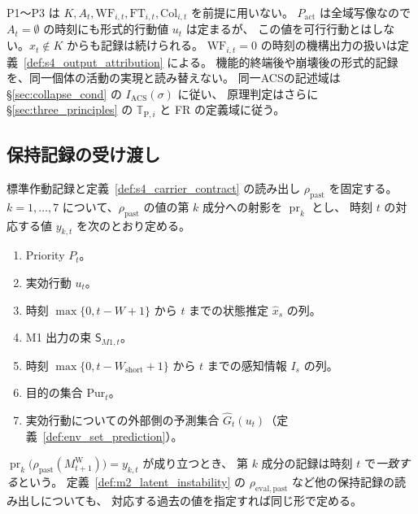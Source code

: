 \begin{remark}[形式的継続と実現の継続]
\label{rem:s5_formal_not_survival}
P1〜P3 は $K,A_t,\mathrm{WF}_{i,t},\mathrm{FT}_{i,t},\mathrm{Col}_{i,t}$ を前提に用いない。
$P_{\mathrm{act}}$ は全域写像なので $A_t=\emptyset$ の時刻にも形式的行動値 $u_t$ は定まるが、
この値を可行行動とはしない。$x_t\notin K$ からも記録は続けられる。
$\mathrm{WF}_{i,t}=0$ の時刻の機構出力の扱いは定義~\ref{def:s4_output_attribution} による。
機能的終端後や崩壊後の形式的記録を、同一個体の活動の実現と読み替えない。
同一ACSの記述域は \S\ref{sec:collapse_cond} の $I_{\mathrm{ACS}}(\sigma)$ に従い、
原理判定はさらに \S\ref{sec:three_principles} の $\mathbb T_{\mathrm P,i}$ と FR の定義域に従う。
\end{remark}

\subsection{保持記録の受け渡し}
\label{subsec:s5_record_handover}
\begin{definition}
\label{def:s5_record_agreement}
標準作動記録と定義~\ref{def:s4_carrier_contract} の読み出し $\rho_{\mathrm{past}}$ を固定する。
$k=1,\ldots,7$ について、$\rho_{\mathrm{past}}$ の値の第 $k$ 成分への射影を $\operatorname{pr}_k$ とし、
時刻 $t$ の対応する値 $y_{k,t}$ を次のとおり定める。
\begin{enumerate}
\item Priority $P_t$。
\item 実効行動 $u_t$。
\item 時刻 $\max\{0,t-W+1\}$ から $t$ までの状態推定 $\hat x_s$ の列。
\item M1 出力の束 $\mathsf S_{M1,t}$。
\item 時刻 $\max\{0,t-W_{\mathrm{short}}+1\}$ から $t$ までの感知情報 $I_s$ の列。
\item 目的の集合 $\mathrm{Pur}_t$。
\item 実効行動についての外部側の予測集合 $\hat G_t(u_t)$（定義~\ref{def:env_set_prediction}）。
\end{enumerate}
$\operatorname{pr}_k\bigl(\rho_{\mathrm{past}}(M^{\mathrm W}_{t+1})\bigr)=y_{k,t}$ が成り立つとき、
第 $k$ 成分の記録は時刻 $t$ で\emph{一致する}という。
定義~\ref{def:m2_latent_instability} の $\rho_{\mathrm{eval,past}}$ など他の保持記録の読み出しについても、
対応する過去の値を指定すれば同じ形で定める。
\end{definition}

